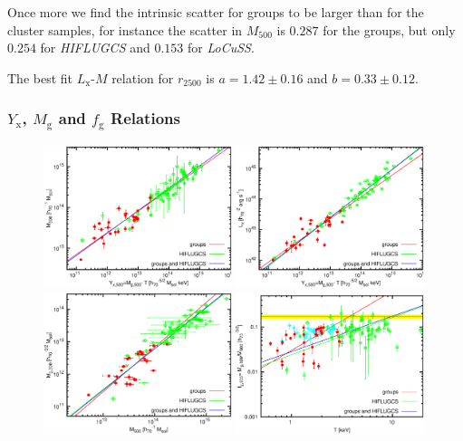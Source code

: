 \documentclass[structabstract]{aa}
\begin{document}
Once more we find the intrinsic scatter for groups to be larger
  than for the cluster samples, for instance the scatter in $M_{500}$
  is $0.287$ for the groups, but only $0.254$ for \emph{HIFLUGCS} and
  $0.153$ for \emph{LoCuSS}.

The best fit $L_{\text{x}}$-$M$ relation for $r_{2500}$ is
  $a=1.42\pm0.16$ and $b=0.33\pm0.12$.


%
\subsubsection{$Y_{\text{x}}$,  $M_{\text{g}}$ and $f_{\text{g}}$ Relations}
\begin{figure}
   \centering
   \includegraphics[width=0.49\textwidth]{yx_m_c.eps}\quad
   \includegraphics[width=0.49\textwidth]{lyhda_c.eps}\\\medskip
   \includegraphics[width=0.49\textwidth]{mg_m_c.eps}\quad
   \includegraphics[width=0.49\textwidth]{fg_t_c.eps}

\end{figure}
\end{document}
